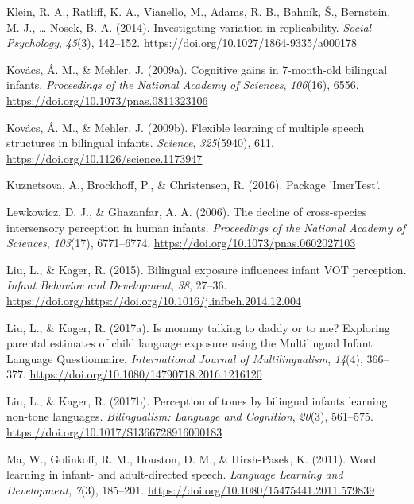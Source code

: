 \documentclass[,man,floatsintext]{apa6}
\begin{document}
\leavevmode\hypertarget{ref-klein_2014}{}%
Klein, R. A., Ratliff, K. A., Vianello, M., Adams, R. B., Bahník, Š., Bernstein, M. J., \ldots{} Nosek, B. A. (2014). Investigating variation in replicability. \emph{Social Psychology}, \emph{45}(3), 142--152. \url{https://doi.org/10.1027/1864-9335/a000178}

\leavevmode\hypertarget{ref-kovacs_2009a}{}%
Kovács, Á. M., \& Mehler, J. (2009a). Cognitive gains in 7-month-old bilingual infants. \emph{Proceedings of the National Academy of Sciences}, \emph{106}(16), 6556. \url{https://doi.org/10.1073/pnas.0811323106}

\leavevmode\hypertarget{ref-kovacs_2009b}{}%
Kovács, Á. M., \& Mehler, J. (2009b). Flexible learning of multiple speech structures in bilingual infants. \emph{Science}, \emph{325}(5940), 611. \url{https://doi.org/10.1126/science.1173947}

\leavevmode\hypertarget{ref-kuznetsova_2016}{}%
Kuznetsova, A., Brockhoff, P., \& Christensen, R. (2016). Package 'ImerTest'.

\leavevmode\hypertarget{ref-lewkowicz_2006}{}%
Lewkowicz, D. J., \& Ghazanfar, A. A. (2006). The decline of cross-species intersensory perception in human infants. \emph{Proceedings of the National Academy of Sciences}, \emph{103}(17), 6771--6774. \url{https://doi.org/10.1073/pnas.0602027103}

\leavevmode\hypertarget{ref-liu_2015}{}%
Liu, L., \& Kager, R. (2015). Bilingual exposure influences infant VOT perception. \emph{Infant Behavior and Development}, \emph{38}, 27--36. \url{https://doi.org/https://doi.org/10.1016/j.infbeh.2014.12.004}

\leavevmode\hypertarget{ref-liu_2017a}{}%
Liu, L., \& Kager, R. (2017a). Is mommy talking to daddy or to me? Exploring parental estimates of child language exposure using the Multilingual Infant Language Questionnaire. \emph{International Journal of Multilingualism}, \emph{14}(4), 366--377. \url{https://doi.org/10.1080/14790718.2016.1216120}

\leavevmode\hypertarget{ref-liu_2017b}{}%
Liu, L., \& Kager, R. (2017b). Perception of tones by bilingual infants learning non-tone languages. \emph{Bilingualism: Language and Cognition}, \emph{20}(3), 561--575. \url{https://doi.org/10.1017/S1366728916000183}

\leavevmode\hypertarget{ref-ma_2011}{}%
Ma, W., Golinkoff, R. M., Houston, D. M., \& Hirsh-Pasek, K. (2011). Word learning in infant- and adult-directed speech. \emph{Language Learning and Development}, \emph{7}(3), 185--201. \url{https://doi.org/10.1080/15475441.2011.579839}
\end{document}

